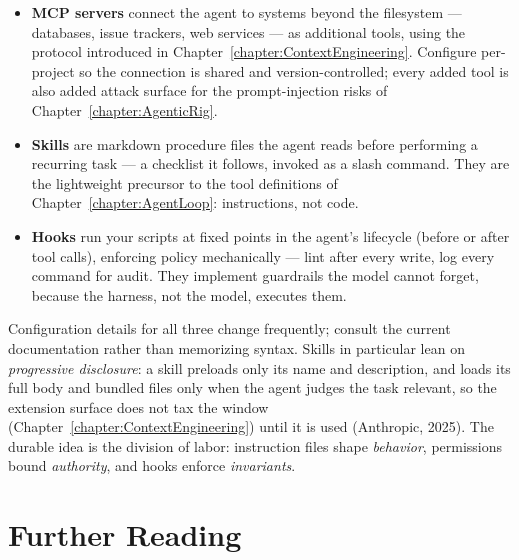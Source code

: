\begin{itemize}
\item \textbf{MCP servers} connect the agent to systems beyond the filesystem --- databases, issue trackers, web services --- as additional tools, using the protocol introduced in Chapter~\ref{chapter:ContextEngineering}. Configure per-project so the connection is shared and version-controlled; every added tool is also added attack surface for the prompt-injection risks of Chapter~\ref{chapter:AgenticRig}.
\item \textbf{Skills} are markdown procedure files the agent reads before performing a recurring task --- a checklist it follows, invoked as a slash command. They are the lightweight precursor to the tool definitions of Chapter~\ref{chapter:AgentLoop}: instructions, not code.
\item \textbf{Hooks} run your scripts at fixed points in the agent's lifecycle (before or after tool calls), enforcing policy mechanically --- lint after every write, log every command for audit. They implement guardrails the model cannot forget, because the harness, not the model, executes them.
\end{itemize}

Configuration details for all three change frequently; consult the current documentation rather than memorizing syntax.
Skills in particular lean on \emph{progressive disclosure}: a skill preloads only its name and description, and loads its full  body and bundled files only when the agent judges the task relevant, so the extension surface does not tax the window (Chapter~\ref{chapter:ContextEngineering}) until it is used (Anthropic, 2025).
The durable idea is the division of labor: instruction files shape \emph{behavior}, permissions bound \emph{authority}, and hooks enforce \emph{invariants}.

\section*{Further Reading}

